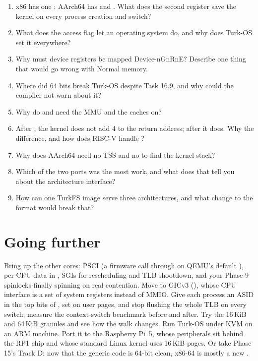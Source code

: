 \documentclass[11pt,a4paper]{article}
\begin{document}
\begin{questionbox}
\begin{enumerate}
  \item x86 has one ; AArch64 has  and . What does the second register save the kernel on every process creation and switch?
  \item What does the access flag let an operating system do, and why does Turk-OS set it everywhere?
  \item Why must device registers be mapped Device-nGnRnE? Describe one thing that would go wrong with Normal memory.
  \item Where did 64 bits break Turk-OS despite Task 16.9, and why could the compiler not warn about it?
  \item Why do  and  need the MMU and the caches on?
  \item After , the kernel does not add 4 to the return address; after  it does. Why the difference, and how does RISC-V handle ?
  \item Why does AArch64 need no TSS and no  to find the kernel stack?
  \item Which of the two ports was the most work, and what does that tell you about the architecture interface?
  \item How can one TurkFS image serve three architectures, and what change to the format would break that?
\end{enumerate}
\end{questionbox}

\section{Going further}

Bring up the other cores: PSCI  (a firmware call through  on QEMU's default ),
per-CPU data in , SGIs for rescheduling and TLB shootdown, and your Phase 9 spinlocks finally spinning
on real contention. Move to GICv3 (), whose CPU interface is a set of system registers instead of
MMIO. Give each process an ASID in the top bits of , set  on user pages, and stop flushing the
whole TLB on every switch; measure the context-switch benchmark before and after. Try the 16\,KiB and 64\,KiB granules
and see how the walk changes. Run Turk-OS under KVM on an ARM machine. Port it to the Raspberry Pi~5, whose
peripherals sit behind the RP1 chip and whose standard Linux kernel uses 16\,KiB pages. Or take Phase 15's Track D: now that the
generic code is 64-bit clean, x86-64 is mostly a new .
\end{document}
